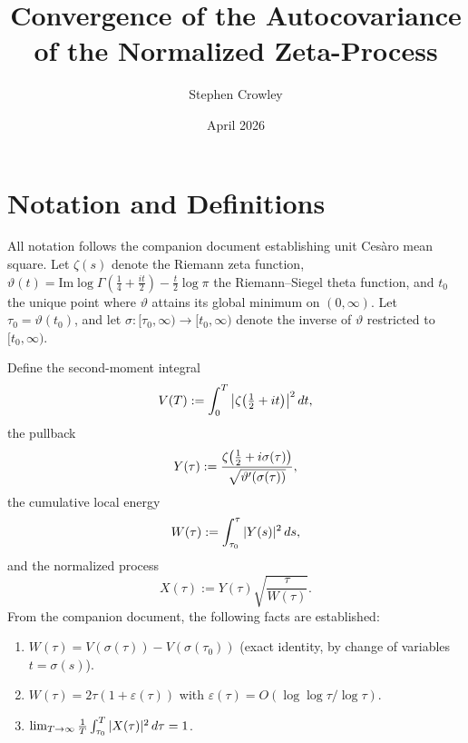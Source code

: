 \documentclass{article}
\newcommand{\assign}{:=}
\begin{document}
\title{Convergence of the Autocovariance of the Normalized Zeta-Process}

\author{Stephen Crowley}

\date{April 2026}

\maketitle

\section{Notation and Definitions}

All notation follows the companion document establishing unit Ces{\`a}ro mean
square. Let $\zeta (s)$ denote the Riemann zeta function, $\vartheta (t) =
\mathrm{Im} \log \Gamma (\tfrac{1}{4} + \tfrac{it}{2}) - \tfrac{t}{2} \log
\pi$ the Riemann--Siegel theta function, and $t_0$ the unique point where
$\vartheta$ attains its global minimum on $(0, \infty)$. Let $\tau_0 =
\vartheta (t_0)$, and let $\sigma : [\tau_0, \infty) \to [t_0, \infty)$ denote
the inverse of $\vartheta$ restricted to $[t_0, \infty)$.

Define the second-moment integral
\[ V (T) \assign \int_0^T \left| \zeta \hspace{-0.17em} \left( \tfrac{1}{2} +
   it \right) \right|^2 dt, \]
the pullback
\[ Y (\tau) \assign \frac{\zeta \hspace{-0.17em} \left( \tfrac{1}{2} + i
   \sigma (\tau) \right)}{\sqrt{\vartheta' (\sigma (\tau))}}, \]
the cumulative local energy
\[ W (\tau) \assign \int_{\tau_0}^{\tau} |Y (s) |^2  \hspace{0.17em} ds, \]
and the normalized process
\[ X (\tau) \assign Y (\tau) \sqrt{\frac{\tau}{W (\tau)}} . \]
From the companion document, the following facts are established:
\begin{enumerate}
  \item[(F1)] $W (\tau) = V (\sigma (\tau)) - V (\sigma (\tau_0))$ (exact
  identity, by change of variables $t = \sigma (s)$).
  
  \item[(F2)] $W (\tau) = 2 \tau (1 + \varepsilon (\tau))$ with $\varepsilon
  (\tau) = O (\log \log \tau / \log \tau)$.
  
  \item[(F3)] $\lim_{T \to \infty}  \frac{1}{T}  \int_{\tau_0}^T |X (\tau) |^2
  \hspace{0.17em} d \tau = 1$.
\end{enumerate}
\end{document}
